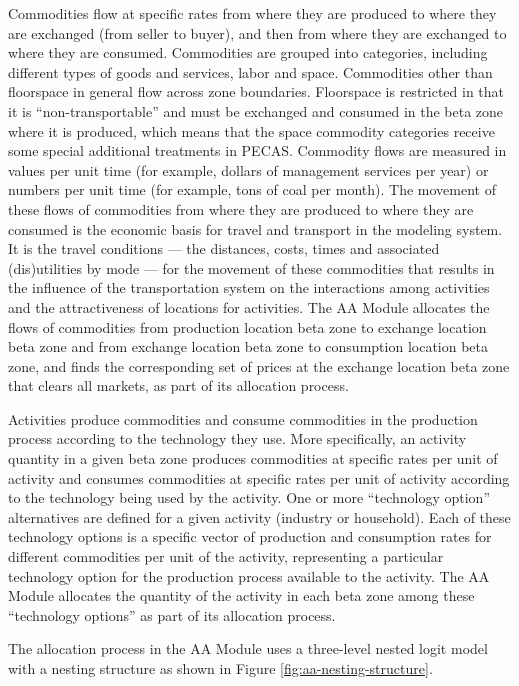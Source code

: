 Commodities flow at specific rates from where they are produced to where they are exchanged (from seller to buyer), and then from where they are exchanged to where they are consumed. Commodities are grouped into categories, including different types of goods and services, labor and space. Commodities other than floorspace in general flow across zone boundaries. Floorspace is restricted in that it is ``non-transportable'' and must be exchanged and consumed in the beta zone where it is produced, which means that the space commodity categories receive some special additional treatments in PECAS.  Commodity flows are measured in values per unit time (for example, dollars of management services per year) or numbers per unit time (for example, tons of coal per month). The movement of these flows of commodities from where they are produced to where they are consumed is the economic basis for travel and transport in the modeling system.  It is the travel conditions --- the distances, costs, times and associated (dis)utilities by mode --- for the movement of these commodities that results in the influence of the transportation system on the interactions among activities and the attractiveness of locations for activities.  The AA Module allocates the flows of commodities from production location beta zone to exchange location beta zone and from exchange location beta zone to consumption location beta zone, and finds the corresponding set of prices at the exchange location beta zone that clears all markets, as part of its allocation process.

Activities produce commodities and consume commodities in the production process according to the technology they use.  More specifically, an activity quantity in a given beta zone produces commodities at specific rates per unit of activity and consumes commodities at specific rates per unit of activity according to the technology being used by the activity. One or more ``technology option'' alternatives are defined for a given activity (industry or household). Each of these technology options is a specific vector of production and consumption rates for different commodities per unit of the activity, representing a particular technology option for the production process available to the activity. The AA Module allocates the quantity of the activity in each beta zone among these ``technology options'' as part of its allocation process.

The allocation process in the AA Module uses a three-level nested logit model with a nesting structure as shown in Figure \ref{fig:aa-nesting-structure}.

